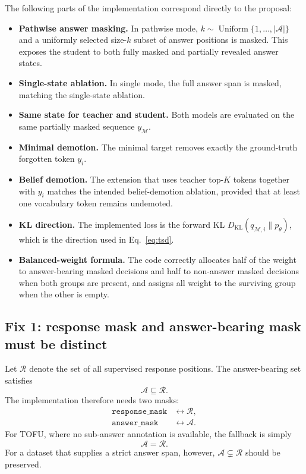 \documentclass{article}
\newcommand{\Mset}{\mathcal{M}}
\newcommand{\Aset}{\mathcal{A}}
\newcommand{\KL}{D_{\mathrm{KL}}}
\begin{document}
The following parts of the implementation correspond directly to the proposal:
\begin{itemize}[leftmargin=*]
    \item \textbf{Pathwise answer masking.}  In pathwise mode,
    $k\sim\operatorname{Uniform}\{1,\ldots,|\Aset|\}$ and a uniformly selected
    size-$k$ subset of answer positions is masked.  This exposes the student to
    both fully masked and partially revealed answer states.
    \item \textbf{Single-state ablation.}  In single mode, the full answer span
    is masked, matching the single-state ablation.
    \item \textbf{Same state for teacher and student.}  Both models are evaluated
    on the same partially masked sequence $y_{\Mset}$.
    \item \textbf{Minimal demotion.}  The minimal target removes exactly the
    ground-truth forgotten token $y_i$.
    \item \textbf{Belief demotion.}  The extension that uses teacher top-$K$
    tokens together with $y_i$ matches the intended belief-demotion ablation,
    provided that at least one vocabulary token remains undemoted.
    \item \textbf{KL direction.}  The implemented loss is the forward KL
    $\KL(q_{\Mset,i}\|p_\theta)$, which is the direction used in
    Eq.~\eqref{eq:tsd}.
    \item \textbf{Balanced-weight formula.}  The code correctly allocates half
    of the weight to answer-bearing masked decisions and half to non-answer
    masked decisions when both groups are present, and assigns all weight to the
    surviving group when the other is empty.
\end{itemize}

\subsection{Fix 1: response mask and answer-bearing mask must be distinct}

Let $\mathcal{R}$ denote the set of all supervised response positions.  The
answer-bearing set satisfies
\begin{equation}
    \Aset\subseteq\mathcal{R}.
\end{equation}
The implementation therefore needs two masks:
\begin{align}
    \texttt{response\_mask} &\leftrightarrow \mathcal{R},\\
    \texttt{answer\_mask}   &\leftrightarrow \Aset.
\end{align}
For TOFU, where no sub-answer annotation is available, the fallback is simply
\begin{equation}
    \Aset=\mathcal{R}.
\end{equation}
For a dataset that supplies a strict answer span, however,
$\Aset\subsetneq\mathcal{R}$ should be preserved.
\end{document}
